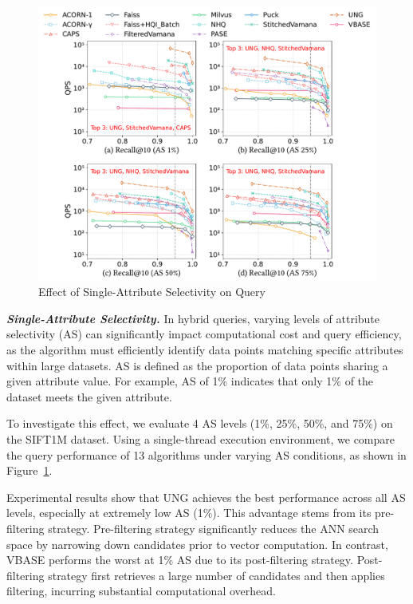 \documentclass[sigconf, nonacm]{acmart}
\begin{document}
\begin{figure}
    \centering
    \setlength{\abovecaptionskip}{0.1cm}
    \setlength{\belowcaptionskip}{-0.1cm}
    \includegraphics[width=\columnwidth]{figures/exp/exp_5_1_1_SingleLabel_1thread.pdf}
    \caption{Effect of Single-Attribute Selectivity on Query}
    \label{fig:exp_5_1_1_SingleLabel_1thread}
\end{figure}


\textit{\textbf{Single-Attribute Selectivity.}}
In hybrid queries, varying levels of attribute selectivity (AS) can significantly impact computational cost and query efficiency, as the algorithm must efficiently identify data points matching specific attributes within large datasets. AS is defined as the proportion of data points sharing a given attribute value. For example, AS of 1\% indicates that only 1\% of the dataset meets the given attribute. 

To investigate this effect, we evaluate 4 AS levels (1\%, 25\%, 50\%, and 75\%) on the SIFT1M dataset. Using a single-thread execution environment, we compare the query performance of 13 algorithms under varying AS conditions, as shown in Figure~\ref{fig:exp_5_1_1_SingleLabel_1thread}.

Experimental results show that UNG achieves the best performance across all AS levels, especially at extremely low AS (1\%). 
This advantage stems from its pre-filtering strategy. Pre-filtering strategy significantly reduces the ANN search space by narrowing down candidates prior to vector computation. In contrast, VBASE performs the worst at 1\% AS due to its post-filtering strategy. Post-filtering strategy first retrieves a large number of candidates and then applies filtering, incurring substantial computational overhead.
\end{document}
